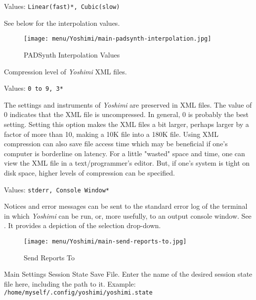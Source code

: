 
   Values: \texttt{Linear(fast)*, Cubic(slow)}

   See  below
   for the interpolation values.

\begin{figure}[H]
   \centering 
   \texttt{[image: menu/Yoshimi/main-padsynth-interpolation.jpg]}
   \caption[PADSynth Interpolation]{PADSynth Interpolation Values}
   \label{fig:padsynth_interpolation}
\end{figure}

   Compression level of \textsl{Yoshimi} XML files.

   Values: \texttt{0 to 9, 3*}

   The settings and instruments of
   \textsl{Yoshimi}
   are preserved in XML files.
   The value of 0 indicates that the XML file is uncompressed.
   In general, 0 is probably the best setting.
   Setting this option makes the XML files a bit larger, perhaps larger by a 
   factor of more than 10, making a 10K file into a 180K file.
   Using XML compression can also save file access time which may be
   beneficial if one's computer is borderline on latency.
   For a little "wasted"
   space and time, one can view the XML file in a text/programmer's editor.
   But, if one's system is tight on disk space, higher levels of compression
   can be specified.


   Values: \texttt{stderr, Console Window*}

   Notices and error messages can be sent to the standard error log of
   the terminal in which 
   \textsl{Yoshimi} can be run, or, more usefully, to
   an output console window.
   See .
   It provides a depiction of the selection drop-down.

\begin{figure}[H]
   \centering 
   \texttt{[image: menu/Yoshimi/main-send-reports-to.jpg]}
   \caption[Send Reports]{Send Reports To}
   \label{fig:send_reports_to}
\end{figure}

   Main Settings Session State Save File.
   Enter the name of the desired session state file here, including
   the path to it.
   Example: \texttt{/home/myself/.config/yoshimi/yoshimi.state}

